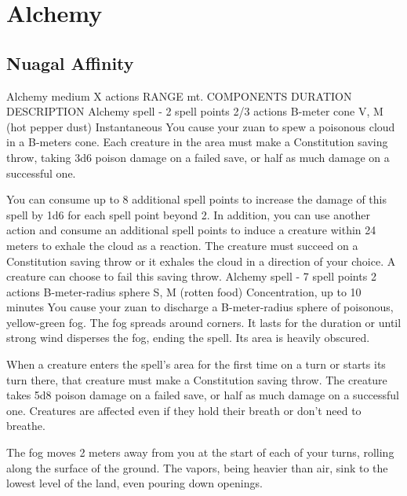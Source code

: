 \section{Alchemy}
\subsection*{Nuagal Affinity}
        {Alchemy medium}
        {X actions}
        {RANGE mt.}
        {COMPONENTS}
        {DURATION}
        DESCRIPTION
        {Alchemy spell - 2 spell points}
        {2/3 actions}
        {B-meter cone}
        {V, M (hot pepper dust)}
        {Instantaneous}
        You cause your zuan to spew a poisonous cloud in a B-meters cone.
        Each creature in the area must make a Constitution saving throw, taking 3d6 poison damage on a failed save, or half as much damage on a successful one.

        You can consume up to 8 additional spell points to increase the damage of this spell by 1d6 for each spell point beyond 2.
        In addition, you can use another action and consume an additional spell points to induce a creature within 24 meters to exhale the cloud as a reaction.
        The creature must succeed on a Constitution saving throw or it exhales the cloud in a direction of your choice.
        A creature can choose to fail this saving throw.
        {Alchemy spell - 7 spell points}
        {2 actions}
        {B-meter-radius sphere}
        {S, M (rotten food)}
        {Concentration, up to 10 minutes}
        You cause your zuan to discharge a B-meter-radius sphere of poisonous, yellow-green fog.
        The fog spreads around corners.
        It lasts for the duration or until strong wind disperses the fog, ending the spell.
        Its area is heavily obscured.

        When a creature enters the spell's area for the first time on a turn or starts its turn there, that creature must make a Constitution saving throw.
        The creature takes 5d8 poison damage on a failed save, or half as much damage on a successful one.
        Creatures are affected even if they hold their breath or don't need to breathe.

        The fog moves 2 meters away from you at the start of each of your turns, rolling along the surface of the ground.
        The vapors, being heavier than air, sink to the lowest level of the land, even pouring down openings.

